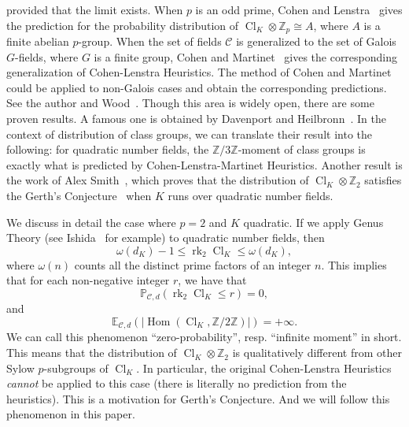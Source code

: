 \documentclass[12pt,a4paper]{amsart}
\numberwithin{equation}{section}%
\theoremstyle{plain}%
\theoremstyle{definition}%
\theoremstyle{remark}%
\begin{document}
	provided that the limit exists.
	When $p$ is an odd prime, Cohen and Lenstra~\cite{CL84} gives the prediction for the probability distribution of $\operatorname{Cl}_K\otimes\mathbb{Z}_p\cong A$, where $A$ is a finite abelian $p$-group.
	When the set of fields $\mathcal{C}$ is generalized to the set of Galois $G$-fields, where $G$ is a finite group, Cohen and Martinet~\cite{CM90} gives the corresponding generalization of Cohen-Lenstra Heuristics.
	The method of Cohen and Martinet could be applied to non-Galois cases and obtain the corresponding predictions.
	See the author and Wood~\cite{wang2021moments}.
	Though this area is widely open, there are some proven results.
	A famous one is obtained by Davenport and Heilbronn~\cite{Davenport1971Cubic}.
	In the context of distribution of class groups, we can translate their result into the following: 
	for quadratic number fields, the $\mathbb{Z}/3\mathbb{Z}$-moment of class groups is exactly what is predicted by Cohen-Lenstra-Martinet Heuristics.
	Another result is the work of Alex Smith~\cite{smith2026distributionI,smith2026distributionII}, which proves that the distribution of $\operatorname{Cl}_K\otimes\mathbb{Z}_2$ satisfies the Gerth's Conjecture~\cite{Gerth1987} when $K$ runs over quadratic number fields.
	
	We discuss in detail the case where $p=2$ and $K$ quadratic.
	If we apply Genus Theory (see Ishida~\cite{ishida1976genus} for example) to quadratic number fields, then
	\begin{equation*}
		\omega(d_K)-1\leq\operatorname{rk}_2\operatorname{Cl}_K\leq\omega(d_K),
	\end{equation*}
	where $\omega(n)$ counts all the distinct prime factors of an integer $n$.
	This implies that for each non-negative integer $r$, we have that
	\begin{equation*}
		\mathbb{P}_{\mathcal{C},d}(\operatorname{rk}_2\operatorname{Cl}_K\leq r)=0,
	\end{equation*}
	and
	\begin{equation*}
		\mathbb{E}_{\mathcal{C},d}(\lvert\operatorname{Hom}(\operatorname{Cl}_K,\mathbb{Z}/2\mathbb{Z})\rvert)=+\infty.
	\end{equation*}
	We can call this phenomenon ``zero-probability'', resp. ``infinite moment'' in short.
	This means that the distribution of $\operatorname{Cl}_K\otimes\mathbb{Z}_2$ is qualitatively different from other Sylow $p$-subgroups of $\operatorname{Cl}_K$.
	In particular, the original Cohen-Lenstra Heuristics \emph{cannot} be applied to this case (there is literally no prediction from the heuristics).
	This is a motivation for Gerth's Conjecture.
	And we will follow this phenomenon in this paper.
	
\end{document}
